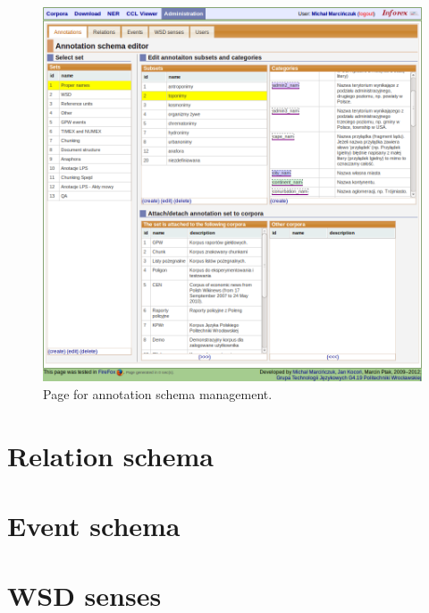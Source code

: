 \documentclass[a4paper,10pt,oneside]{scrbook}
\begin{document}
 \begin{figure}[h]
    \centering
    \includegraphics{images/inforex-administration-annotations.png}
    \caption{Page for annotation schema management.}
    \label{fig:inforex-administration-annotatons}
  \end{figure}


\section{Relation schema}

\section{Event schema}

\section{WSD senses}
\end{document}
